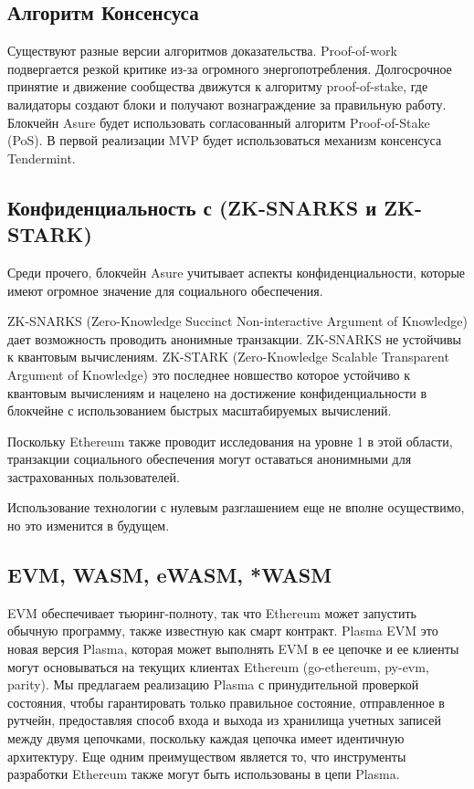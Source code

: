 \subsection{Алгоритм Консенсуса}
Существуют разные версии алгоритмов доказательства. Proof-of-work подвергается резкой критике из-за огромного энергопотребления.\cite{hackernoon} Долгосрочное принятие и движение сообщества движутся к алгоритму proof-of-stake, где валидаторы создают блоки и получают вознаграждение за правильную работу. Блокчейн Asure будет использовать согласованный алгоритм Proof-of-Stake (PoS). В первой реализации MVP будет использоваться механизм консенсуса Tendermint.\cite{tendermint}

\subsection{Конфиденциальность с (ZK-SNARKS и ZK-STARK)}
Среди прочего, блокчейн Asure учитывает аспекты конфиденциальности, которые имеют огромное значение для социального обеспечения.

ZK-SNARKS (Zero-Knowledge Succinct Non-interactive Argument of Knowledge) дает возможность проводить анонимные транзакции. ZK-SNARKS не устойчивы к квантовым вычислениям. ZK-STARK (Zero-Knowledge Scalable Transparent Argument of Knowledge) это последнее новшество которое устойчиво к квантовым вычислениям и нацелено на достижение конфиденциальности в блокчейне с использованием быстрых масштабируемых вычислений. \cite{iacr}

Поскольку Ethereum также проводит исследования на уровне 1 в этой области, транзакции социального обеспечения могут оставаться анонимными для застрахованных пользователей. \cite{ethereum_zksnarks}

Использование технологии с нулевым разглашением еще не вполне осуществимо, но это изменится в будущем.

\subsection{EVM, WASM, eWASM, *WASM}
EVM обеспечивает тьюринг-полноту, так что Ethereum может запустить обычную программу, также известную как смарт контракт. Plasma EVM это новая версия Plasma, которая может выполнять EVM в ее цепочке и ее клиенты могут основываться на текущих клиентах Ethereum (go-ethereum, py-evm, parity). Мы предлагаем реализацию Plasma с принудительной проверкой состояния, чтобы гарантировать только правильное состояние, отправленное в рутчейн, предоставляя способ входа и выхода из хранилища учетных записей между двумя цепочками, поскольку каждая цепочка имеет идентичную архитектуру. Еще одним преимуществом является то, что инструменты разработки Ethereum также могут быть использованы в цепи Plasma.

